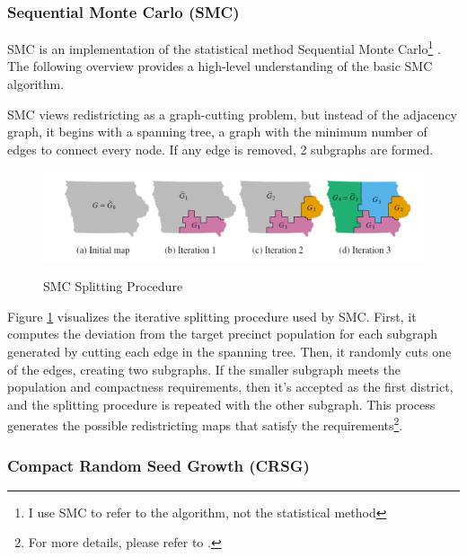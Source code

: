 \subsubsection{Sequential Monte Carlo (SMC)}
\label{sec:smc}

SMC is an implementation of the statistical method Sequential Monte Carlo\footnote{I use SMC to refer to the algorithm, not the statistical method} \parencite{mccartan2020}. The following overview provides a high-level understanding of the basic SMC algorithm.

SMC views redistricting as a graph-cutting problem, but instead of the adjacency graph, it begins with a spanning tree, a graph with the minimum number of edges to connect every node. If any edge is removed, 2 subgraphs are formed. 

\begin{figure}[hb]
    \caption{SMC Splitting Procedure}
    \includegraphics[width=\linewidth]{img/smc.PNG}
    \label{fig:smc}
    \raggedright
\end{figure}

Figure \ref{fig:smc} visualizes the iterative splitting procedure used by SMC. First, it computes the deviation from the target precinct population for each subgraph generated by cutting each edge in the spanning tree. Then, it randomly cuts one of the edges, creating two subgraphs. If the smaller subgraph meets the population and compactness requirements, then it's accepted as the first district, and the splitting procedure is repeated with the other subgraph. This process generates the possible redistricting maps that satisfy the requirements\footnote{For more details, please refer to \textcite{mccartan2020}.}.

\subsubsection{Compact Random Seed Growth (CRSG)}
\label{sec:crsg}

